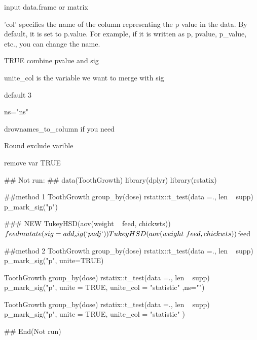 \documentclass[a4paper]{book}
\begin{document}
\begin{Arguments}
\begin{ldescription}
\item[\code{data}] input data.frame or matrix

\item[\code{col}] 'col' specifies the name of the column representing the p value in the data. By default, it is set to p.value. For example, if it is written as p, pvalue, p\_value, etc., you can change the name.

\item[\code{unite}] TRUE combine pvalue and sig

\item[\code{unite\_col}] unite\_col is the variable we want to merge with sig

\item[\code{digits}] default 3

\item[\code{ns}] ns="ns"

\item[\code{rownames\_to\_column}] drownames\_to\_column if you need

\item[\code{exclude}] Round exclude varible

\item[\code{remove}] remove var TRUE
\end{ldescription}
\end{Arguments}
%
\begin{Examples}
\begin{ExampleCode}

## Not run: 
## data(ToothGrowth)
library(dplyr)
library(rstatix)

##method 1
 ToothGrowth %
  group_by(dose) %
  rstatix::t_test(data =., len ~ supp) %
  p_mark_sig("p")

  ### NEW
  TukeyHSD(aov(weight ~ feed, chickwts))$feed %
  mutate(sig = add_sig(`p adj`))

  TukeyHSD(aov(weight ~ feed, chickwts))$feed %


##method 2
 ToothGrowth %
 group_by(dose) %
 rstatix::t_test(data =., len ~ supp) %
  p_mark_sig("p", unite=TRUE)


 ToothGrowth %
     group_by(dose) %
    rstatix::t_test(data =., len ~ supp) %
    p_mark_sig("p", unite = TRUE, unite_col = "statistic" ,ns="")

 ToothGrowth %
   group_by(dose) %
   rstatix::t_test(data =., len ~ supp) %
   p_mark_sig("p", unite = TRUE, unite_col = "statistic" )

## End(Not run)


\end{ExampleCode}
\end{Examples}
\end{document}
